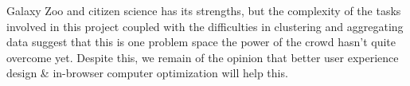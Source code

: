\documentclass[../main.tex]{subfiles}
\begin{document}
\label{sec:conclusions}
Galaxy Zoo and citizen science has its strengths, but the complexity of the tasks involved in this project coupled with the difficulties in clustering and aggregating data suggest that this is one problem space the power of the crowd hasn't quite overcome yet. Despite this, we remain of the opinion that better user experience design \& in-browser computer optimization will help this.
\end{document}
